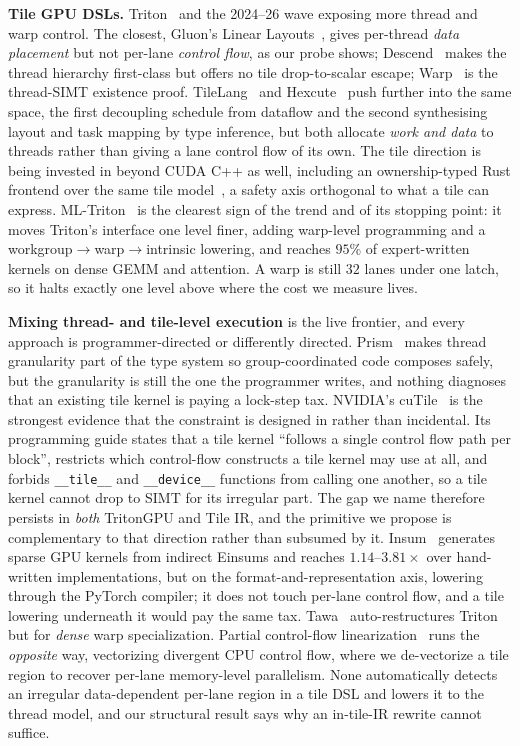 \documentclass[sigplan,screen,review]{acmart}
\begin{document}
\textbf{Tile GPU DSLs.} Triton~\cite{triton2019} and the 2024--26 wave exposing more
thread and warp control. The closest, Gluon's Linear Layouts~\cite{linearlayouts2025},
gives per-thread \emph{data placement} but not per-lane \emph{control flow}, as our probe
shows; Descend~\cite{descend2024} makes the thread hierarchy first-class but offers no tile
drop-to-scalar escape; Warp~\cite{warp2022} is the thread-SIMT existence proof. TileLang~\cite{tilelang2025} and Hexcute~\cite{hexcute2025} push further into the same
space, the first decoupling schedule from dataflow and the second synthesising layout and
task mapping by type inference, but both allocate \emph{work and data} to threads rather
than giving a lane control flow of its own. The tile direction is being invested in beyond
CUDA C++ as well, including an ownership-typed Rust frontend over the same tile
model~\cite{fearless2026}, a safety axis orthogonal to what a tile can express.
ML-Triton~\cite{mltriton2025} is the clearest sign of the trend and of its stopping point:
it moves Triton's interface one level finer, adding warp-level programming and a
workgroup$\rightarrow$warp$\rightarrow$intrinsic lowering, and reaches $95\%$ of
expert-written kernels on dense GEMM and attention. A warp is still $32$ lanes under one
latch, so it halts exactly one level above where the cost we measure lives.

\textbf{Mixing thread- and tile-level execution} is the live frontier, and every approach
is programmer-directed or differently directed. Prism~\cite{prism2026} makes thread
granularity part of the type system so group-coordinated code composes safely, but the
granularity is still the one the programmer writes, and nothing diagnoses that an existing
tile kernel is paying a lock-step tax. NVIDIA's cuTile~\cite{cutile2025} is the strongest
evidence that the constraint is designed in rather than incidental. Its programming guide
states that a tile kernel ``follows a single control flow path per block'', restricts which
control-flow constructs a tile kernel may use at all, and forbids \texttt{\_\_tile\_\_}
and \texttt{\_\_device\_\_} functions from calling one another, so a tile kernel cannot
drop to SIMT for its irregular part. The gap we name therefore persists in \emph{both}
TritonGPU and Tile IR, and the primitive we propose is complementary to that direction
rather than subsumed by it. Insum~\cite{insum2026} generates sparse GPU kernels from
indirect Einsums and reaches $1.14$--$3.81\times$ over hand-written implementations, but on
the format-and-representation axis, lowering through the PyTorch compiler; it does not touch
per-lane control flow, and a tile lowering underneath it would pay the same tax. Tawa~\cite{tawa2026} auto-restructures Triton but for \emph{dense} warp
specialization. Partial control-flow linearization~\cite{partialcfg2018} runs the
\emph{opposite} way, vectorizing divergent CPU control flow, where we de-vectorize a tile
region to recover per-lane memory-level parallelism. None automatically detects an
irregular data-dependent per-lane region in a tile DSL and lowers it to the thread model,
and our structural result says why an in-tile-IR rewrite cannot suffice.
\end{document}
